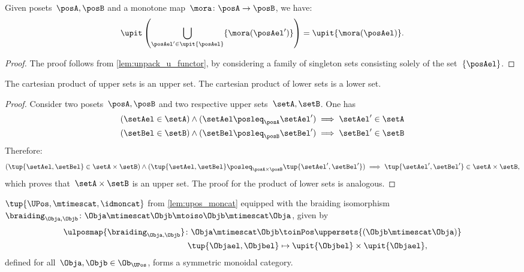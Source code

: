 \begin{lemma}
  \label{lem:unpack_part_2}
  Given posets~$\posA,\posB$ and a monotone map~$\mora\colon \posA\to \posB$, we have:
  \begin{equation}
    \upit \left( \bigcup_{\posAel'\in \upit \{\posAel\}} \{\mora(\posAel')\}\right)=\upit \{\mora(\posAel)\}.
  \end{equation}
\end{lemma}
\begin{proof}
  The proof follows from \cref{lem:unpack_u_functor}, by considering a family of singleton sets consisting solely of the set~$\{\posAel\}$.
\end{proof}

\begin{lemma}
    The cartesian product of upper sets is an upper set.
    The cartesian product of lower sets is a lower set.
\end{lemma}
\begin{proof}
    Consider two posets~$\posA,\posB$ and two respective upper sets~$\setA,\setB$.
    One has
    \begin{equation*}
        \begin{aligned}
        (\setAel \in \setA)\wedge (\setAel \posleq_\posA \setAel') &\implies \setAel'\in \setA\\
        (\setBel \in \setB)\wedge (\setBel \posleq_\posB \setBel') &\implies \setBel'\in \setB
        \end{aligned}
    \end{equation*}
    Therefore:
    \begin{equation*}
        (\tup{\setAel,\setBel} \in \setA\times \setB)\wedge (\tup{\setAel,\setBel} \posleq_{\posA \times \posB} \tup{\setAel',\setBel'}) \implies \tup{\setAel',\setBel'}\in \setA \times \setB,
    \end{equation*}
    which proves that~$\setA\times \setB$ is an upper set.
    The proof for the product of lower sets is analogous.
\end{proof}
\begin{lemma}
    \label{lem:UPos-is-sym-mon}
    $\tup{\UPos,\mtimescat,\idmoncat}$ from \cref{lem:upos_moncat} equipped with the braiding isomorphism~$\braiding_{\Obja,\Objb}\colon \Obja \mtimescat \Objb \mtoiso \Objb \mtimescat \Obja$, given by
    \begin{equation}
        \label{eq:Upos-braiding}
        \begin{aligned}
        \ulposmap{\braiding_{\Obja,\Objb}}\colon \Obja \mtimescat \Objb &\toinPos \uppersets{(\Objb \mtimescat \Obja)}\\
            \tup{\Objael,\Objbel}&\mapsto \upit\{\Objbel\} \times \upit\{\Objael\},
        \end{aligned}
    \end{equation}
    defined for all~$\Obja,\Objb\in \Ob_{\UPos}$, forms a symmetric monoidal category.
\end{lemma}
